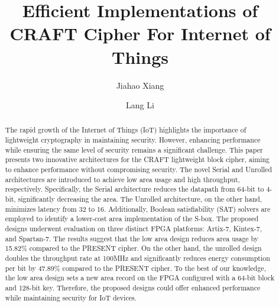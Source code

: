 \documentclass[final,5p,times,twocolumn]{elsarticle}
\begin{document}
\begin{frontmatter}

    \title{Efficient Implementations of CRAFT Cipher For Internet of Things }

    \author[]{Jiahao Xiang}
    \author[]{Lang Li}







    \begin{abstract}
        The rapid growth of the Internet of Things (IoT) highlights the importance of lightweight cryptography in maintaining security.
        However, enhancing performance while ensuring the same level of security remains a significant challenge.
        This paper presents two innovative architectures for the CRAFT lightweight block cipher, aiming to enhance performance without compromising security.
        The novel Serial and Unrolled architectures are introduced to achieve low area usage and high throughput, respectively.
        Specifically, the Serial architecture reduces the datapath from 64-bit to 4-bit, significantly decreasing the area.
        The Unrolled architecture, on the other hand, minimizes latency from 32 to 16.
        Additionally, Boolean satisfiability (SAT) solvers are employed to identify a lower-cost area implementation of the S-box.
        The proposed designs underwent evaluation on three distinct FPGA platforms: Artix-7, Kintex-7, and Spartan-7.
        The results suggest that the low area design reduces area usage by 15.82\% compared to the PRESENT cipher.
        On the other hand, the unrolled design doubles the throughput rate at 100MHz and significantly reduces energy consumption per bit by 47.89\% compared to the PRESENT cipher.
        To the best of our knowledge, the low area design sets a new area record on the FPGA configured with a 64-bit block and 128-bit key.
        Therefore, the proposed designs could offer enhanced performance while maintaining security for IoT devices.
    \end{abstract}



\end{frontmatter}
\end{document}
